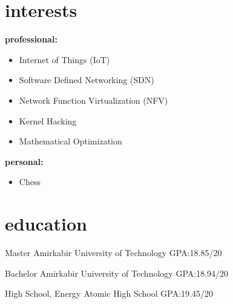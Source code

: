 \documentclass[]{friggeri-cv} %
\begin{document}

\section{interests}
\textbf{professional:}
\begin{itemize}
  \item Internet of Things (IoT)
  \item Software Defined Networking (SDN)
  \item Network Function Virtualization (NFV)
  \item Kernel Hacking
  \item Mathematical Optimization
\end{itemize}
\textbf{personal:}
\begin{itemize}
  \item Chess
\end{itemize}



\section{education}

\begin{entrylist}


  {Master }
  {Amirkabir University of Technology}
  {GPA:\@ 18.85/20}


  {Bachelor }
  {Amirkabir University of Technology}
  {GPA:\@ 18.94/20}


  {High School, }
  {Energy Atomic High School}
  {GPA:\@ 19.45/20}



\end{entrylist}
\pagebreak
\end{document}
